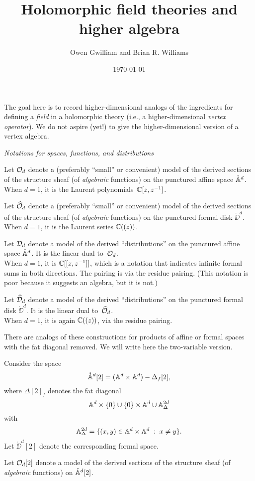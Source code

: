 \documentclass[11pt]{amsart}
\author{Owen Gwilliam and Brian R. Williams}
\date{\today}
\title{Holomorphic field theories and higher algebra}
\begin{document}
The goal here is to record higher-dimensional analogs of the ingredients for defining a {\em field} in a holomorphic theory (i.e., a higher-dimensional {\em vertex operator}). We do not aspire (yet!) to give the higher-dimensional version of a vertex algebra.

{\it Notations for spaces, functions, and distributions}

Let $\cO_d$ denote a (preferably ``small'' or convenient) model of the derived sections of the structure sheaf (of {\em algebraic} functions) on the punctured affine space $\mathring{\AA}^d$.\\
{\tiny When $d=1$, it is the Laurent polynomials~$\CC[z,z^{-1}]$.}

Let $\widehat{\cO}_d$ denote a (preferably ``small'' or convenient) model of the derived sections of the structure sheaf (of {\em algebraic} functions) on the punctured formal disk $\mathring{\DD}^d$.\\
{\tiny When $d=1$, it is the Laurent series $\CC((z))$.}

Let $\cD_d$ denote a model of the derived ``distributions'' on the punctured affine space $\mathring{\AA}^d$. It is the linear dual to~$\cO_d$.\\
{\tiny When $d=1$, it is $\CC[[z,z^{-1}]]$, which is a notation that indicates infinite formal sums in both directions. The pairing is via the residue pairing. (This notation is poor because it suggests an algebra, but it is not.)}

Let $\widehat{\cD}_d$ denote a model of the derived ``distributions'' on the punctured formal disk $\mathring{\DD}^d$. It is the linear dual to~$\widehat{\cO}_d$.\\
{\tiny When $d=1$, it is again $\CC((z))$, via the residue pairing.}

There are analogs of these constructions for products of affine or formal spaces with the fat diagonal removed.
We will write here the two-variable version.

Consider the space 
\[
\mathring{\AA}^{d}[2]= (\AA^d \times \AA^d) - \Delta_f{[2]}, 
\]
where $\Delta[2]_f$ denotes the fat diagonal
\[
\AA^d \times \{0\} \cup \{0\} \times \AA^d \cup \AA^{2d}_\Delta
\]
with
\[
 \AA^{2d}_\Delta = \{ (x,y) \in \AA^d \times \AA^d \; : \; x \neq y\}.
\]
Let $\mathring{\DD}^d[2]$ denote the corresponding formal space.

Let $\cO_d{[2]}$ denote a model of the derived sections of the structure sheaf (of {\em algebraic} functions) on $\mathring{\AA}^d[2]$.
\end{document}
